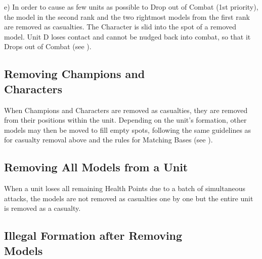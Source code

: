\begin{figure*}[!p]
\begin{minipage}{0.43\textwidth}
{		e) In order to cause as few units as possible to Drop out of Combat (1st priority), the model in the second rank and the two rightmost \rnf{} models from the first rank are removed as casualties. The Character is slid into the spot of a removed \rnf{} model. Unit D loses contact and cannot be nudged back into combat, so that it Drops out of Combat (see ).\captionpar
	}
	\label{figure/removing_rnf_models}
	\end{minipage}
\end{figure*}

\columnbreak

\subsection[Removing Champions and Characters]{Removing Champions and\\ Characters}
\label{removing_non_RnF_models}
 
When Champions and Characters are removed as casualties, they are removed from their positions within the unit. Depending on the unit's formation, other models may then be moved to fill empty spots, following the same guidelines as for casualty removal above and the rules for Matching Bases (see ).

\subsection{Removing All Models from a Unit}
\label{removing_all_models_from_a_unit}

When a unit loses all remaining Health Points due to a batch of simultaneous attacks, the models are not removed as casualties one by one but the entire unit is removed as a casualty.

\subsection[Illegal Formation after Removing Models]{Illegal Formation after Removing\\ Models}
\label{illegal_formation_after_removing_models}

